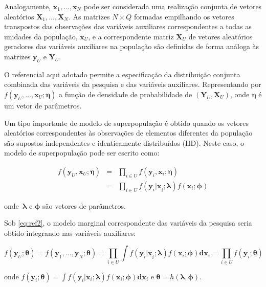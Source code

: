 \documentclass[]{book}
\theoremstyle{definition}
\theoremstyle{definition}
\theoremstyle{definition}
\theoremstyle{remark}
\begin{document}
Analogamente, \(\mathbf{x}_1 ,\ldots, \mathbf{x}_N\) pode ser
considerada uma realização conjunta de vetores aleatórios
\(\mathbf{X}_1 ,\ldots, \mathbf{X}_N\). As matrizes \(N \times Q\)
formadas empilhando os vetores transpostos das observações das variáveis
auxiliares correspondentes a todas as unidades da população,
\(\mathbf{x}_{U}\), e a correspondente matriz \(\mathbf{X}_{U}\) de
vetores aleatórios geradores das variáveis auxiliares na população são
definidas de forma análoga às matrizes \(\mathbf{y}_{U}\) e
\(\mathbf{Y}_{U}\).

O referencial aqui adotado permite a especificação da distribuição
conjunta combinada das variáveis da pesquisa e das variáveis auxiliares.
Representando por
\(f( \mathbf{y}_U ,\ldots, \mathbf{x}_U ; \mathbf{\eta} )\) a função de
densidade de probabilidade de \(( \mathbf{Y}_U , \mathbf{X}_U )\), onde
\(\mathbf{\eta}\) é um vetor de parâmetros.

Um tipo importante de modelo de superpopulação é obtido quando os
vetores aleatórios correspondentes às observações de elementos
diferentes da população são supostos independentes e identicamente
distribuídos (IID). Neste caso, o modelo de superpopulação pode ser
escrito como:

\begin{eqnarray}
f \left( \mathbf{y}_U , \mathbf{x}_U ; \mathbf{\eta} \right) 
&=&\prod_{i\in U} f\left(\mathbf{y}_i , \mathbf{x}_i ; \mathbf{\eta} \right) \label{eq:ref1} \\
&=&\prod_{i\in U} f\left( \mathbf{y}_i \mathbf{|x}_i ; \mathbf{\lambda} \right) 
f\left( \mathbf{x}_i ; \mathbf{\phi} \right) \label{eq:ref2}
\end{eqnarray}

onde~\(\mathbf{\lambda}\) e \(\mathbf{\phi}\) são vetores de parâmetros.

Sob \eqref{eq:ref2}, o modelo marginal correspondente das variáveis da
pesquisa seria obtido integrando nas variáveis auxiliares:

\begin{equation}
f(\mathbf{y}_U ; \mathbf{\theta}) = f(\mathbf{y}_1 ,\ldots ,\mathbf{y}_N ; \mathbf{\theta}) = \prod_{i\in U} \int f\left( \mathbf{y}_i \mathbf{|x}_i ; \mathbf{\lambda} \right) f\left( \mathbf{x}_i ; \mathbf{\phi} \right) \mathbf{dx}_i = \prod_{i\in U} f\left( \mathbf{y}_i ; \mathbf{\theta} \right) \label{eq:ref3}
\end{equation}

onde
\(f\left( \mathbf{y}_i ; \mathbf{\theta} \right) = \int f\left( \mathbf{y}_i | \mathbf{x}_i ; \mathbf{\lambda} \right) f\left( \mathbf{x}_i ; \mathbf{\phi} \right) \mathbf{dx}_i\)
e
\(\mathbf{\theta =} h\left( \mathbf{\lambda} , \mathbf{\phi} \right)\).
\end{document}
